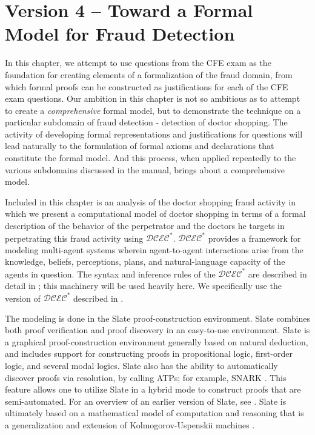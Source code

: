  
\chapter{Version 4 -- Toward a Formal Model for Fraud Detection}

In this chapter, we attempt to use questions from the CFE exam as the foundation for creating elements of a formalization of the fraud domain, from which formal proofs can be constructed as justifications for each of the CFE exam questions.  Our ambition in this chapter is not so ambitious as to attempt to create a \emph{comprehensive} formal model, but to demonstrate the technique on a particular subdomain of fraud detection - detection of doctor shopping.  The activity of developing formal representations and justifications for questions will lead naturally to the formulation of formal axioms and declarations that constitute the formal model.  And this process, when applied repeatedly to the various subdomains discussed in the manual, brings about a comprehensive model.

Included in this chapter is an analysis of the doctor shopping fraud activity in which we present a 
computational model of doctor shopping in terms of a formal description of the behavior of the perpetrator and the doctors he targets in perpetrating this fraud activity using $\mathcal{DCEC}^\ast$.  $\mathcal{DCEC}^\ast$
provides a framework for modeling multi-agent systems wherein
agent-to-agent interactions arise from the knowledge, beliefs,
perceptions, plans, and natural-language capacity of the agents in
question.  The syntax and inference rules of the $\mathcal{DCEC}^\ast$
are described in detail in \cite{mgmmm_ptai_sb,ka_sb_scc_seqcalc};
this machinery will be used heavily here.  We specifically use the
version of $\mathcal{DCEC}^\ast$ described in
\cite{ka_sb_scc_seqcalc}.


The modeling is done in the Slate proof-construction environment.
Slate combines both proof verification and proof discovery in an
easy-to-use environment.  Slate is a graphical proof-construction
environment generally based on natural deduction, and includes support
for constructing proofs in propositional logic, first-order logic, and
several modal logics.  Slate also has the ability to automatically
discover proofs via resolution, by calling ATPs; for example, SNARK
\cite{snarksri}.  This feature allows one to utilize Slate in a hybrid
mode to construct proofs that are semi-automated.  For an overview of
an earlier version of Slate, see \cite{Slate_at_CMNA08}.  Slate is
ultimately based on a mathematical model of computation and reasoning
that is a generalization and extension of Kolmogorov-Uspenskii
machines
\cite{kolmogorov1958definition,bringsjord_sundar_g_unprov_ct}.


